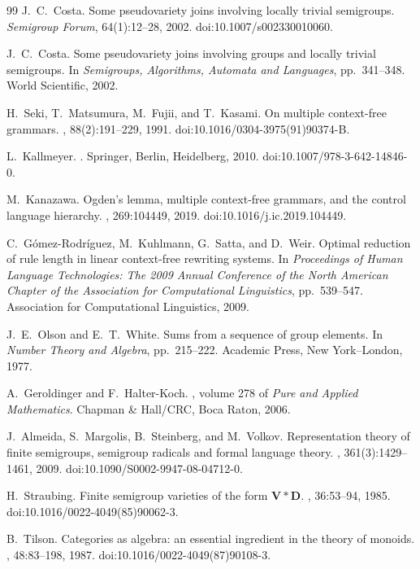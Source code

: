 \documentclass[11pt,a4paper]{ltjsarticle}
\numberwithin{equation}{section}
\theoremstyle{plain}
\theoremstyle{definition}
\theoremstyle{remark}
\theoremstyle{plain}
\begin{document}
\begin{thebibliography}{99}
J.~C.~Costa.
\newblock Some pseudovariety joins involving locally trivial semigroups.
\newblock \emph{Semigroup Forum}, 64(1):12--28, 2002.
\newblock doi:10.1007/s002330010060.

J.~C.~Costa.
\newblock Some pseudovariety joins involving groups and locally trivial semigroups.
\newblock In \emph{Semigroups, Algorithms, Automata and Languages},
pp.~341--348. World Scientific, 2002.

H.~Seki, T.~Matsumura, M.~Fujii, and T.~Kasami.
\newblock On multiple context-free grammars.
, 88(2):191--229, 1991.
\newblock doi:10.1016/0304-3975(91)90374-B.

L.~Kallmeyer.
.
\newblock Springer, Berlin, Heidelberg, 2010.
\newblock doi:10.1007/978-3-642-14846-0.

M.~Kanazawa.
\newblock Ogden's lemma, multiple context-free grammars, and the control language hierarchy.
, 269:104449, 2019.
\newblock doi:10.1016/j.ic.2019.104449.

C.~G\'omez-Rodr\'iguez, M.~Kuhlmann, G.~Satta, and D.~Weir.
\newblock Optimal reduction of rule length in linear context-free rewriting systems.
\newblock In {\em Proceedings of Human Language Technologies: The 2009 Annual
Conference of the North American Chapter of the Association for Computational
Linguistics}, pp.~539--547. Association for Computational Linguistics, 2009.

J.~E.~Olson and E.~T.~White.
\newblock Sums from a sequence of group elements.
\newblock In \emph{Number Theory and Algebra}, pp.~215--222.
Academic Press, New York--London, 1977.

A.~Geroldinger and F.~Halter-Koch.
, volume 278 of {\em Pure and Applied Mathematics}.
\newblock Chapman \& Hall/CRC, Boca Raton, 2006.

J.~Almeida, S.~Margolis, B.~Steinberg, and M.~Volkov.
\newblock Representation theory of finite semigroups, semigroup radicals and
formal language theory.
,
361(3):1429--1461, 2009.
\newblock doi:10.1090/S0002-9947-08-04712-0.

H.~Straubing.
\newblock Finite semigroup varieties of the form $\mathbf V*\mathbf D$.
, 36:53--94, 1985.
\newblock doi:10.1016/0022-4049(85)90062-3.

B.~Tilson.
\newblock Categories as algebra: an essential ingredient in the theory of monoids.
, 48:83--198, 1987.
\newblock doi:10.1016/0022-4049(87)90108-3.

\end{thebibliography}
\normalsize
\end{document}
